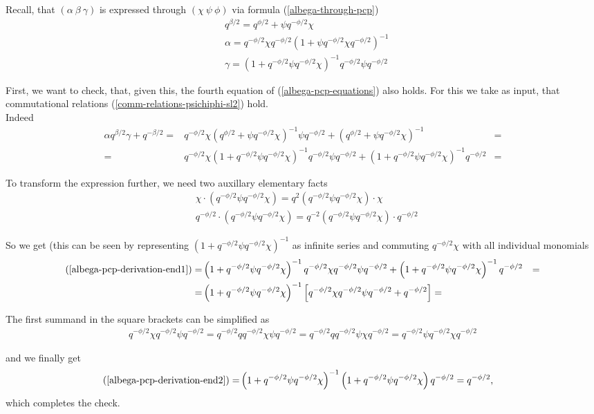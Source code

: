 \documentclass{article}
\newcommand{\lb}{\left (}
\newcommand{\rb}{\right )}
\newcommand{\lsb}{\left [}
\newcommand{\rsb}{\right ]}
\newcommand{\be}{\begin{eqnarray}}
\newcommand{\ee}{\end{eqnarray}}
\newcommand {\?}{\textit{???}}
\newcommand{\delabel}[1]{(\ref{#1})}
\begin{document}
Recall, that $(\alpha\ \beta\ \gamma)$ is expressed through $(\chi\ \psi\ \phi)$ via formula \delabel{albega-through-pcp}
\be
& q^{\beta/2} = q^{\phi/2} + \psi q^{-\phi/2} \chi \nonumber \\
& \alpha = q^{-\phi/2} \chi q^{-\phi/2} \lb 1 + \psi q^{-\phi/2} \chi q^{-\phi/2} \rb^{-1} \nonumber \\
& \gamma = \lb 1 + q^{-\phi/2} \psi q^{-\phi/2} \chi \rb^{-1} q^{-\phi/2} \psi q^{-\phi/2} \nonumber 
\ee

First, we want to check, that, given this, the fourth equation of \delabel{albega-pcp-equations} also holds.
For this we take as input, that commutational relations \delabel{comm-relations-psichiphi-sl2} hold.
\\
Indeed
\def\qbHalf{\lb q^{\phi/2} + \psi q^{-\phi/2} \chi \rb}
\def\qbMinusHalf{\qbHalf^{-1}}
\def\qbHalfNorm{\lb 1 + q^{-\phi/2} \psi q^{-\phi/2} \chi \rb}
\def\qbMinusHalfNorm{\qbHalfNorm^{-1}}
\be
\alpha q^{\beta/2} \gamma + q^{-\beta/2}
= & q^{-\phi/2}\chi \qbMinusHalf \psi q^{-\phi/2}
+ \qbMinusHalf & = \nonumber \\
\label{albega-pcp-derivation-end1}
= & q^{-\phi/2} \chi \qbMinusHalfNorm q^{-\phi/2} \psi q^{-\phi/2} + \qbMinusHalfNorm q^{-\phi/2} & =
\ee

To transform the expression further, we need two auxillary elementary facts
\be
& \chi \cdot \lb q^{-\phi/2} \psi q^{-\phi/2} \chi \rb
= q^{2} \lb q^{-\phi/2}\psi q^{-\phi/2} \chi \rb \cdot \chi \nonumber \\
& q^{-\phi/2} \cdot \lb q^{-\phi/2} \psi q^{-\phi/2} \chi \rb
= q^{-2} \lb q^{-\phi/2}\psi q^{-\phi/2} \chi \rb \cdot q^{-\phi/2} \nonumber
\ee

So we get (this can be seen by representing $\qbMinusHalfNorm$ as infinite series and commuting $q^{-\phi/2}\chi$
with all individual monomials
\be
\delabel{albega-pcp-derivation-end1} = & \qbMinusHalfNorm q^{-\phi/2} \chi q^{-\phi/2} \psi q^{-\phi/2}
+ \qbMinusHalfNorm q^{-\phi/2} & = \nonumber \\
= & \qbMinusHalfNorm \lsb q^{-\phi/2} \chi q^{-\phi/2} \psi q^{-\phi/2} + q^{-\phi/2}\rsb = \label{albega-pcp-derivation-end2}
\ee

The first summand in the square brackets can be simplified as
\be
q^{-\phi/2} \chi q^{-\phi/2} \psi q^{-\phi/2} = q^{-\phi/2} q q^{-\phi/2} \chi \psi q^{-\phi/2}
= q^{-\phi/2} q q^{-\phi/2} \psi \chi q^{-\phi/2} = q^{-\phi/2} \psi q^{-\phi/2} \chi q^{-\phi/2} \nonumber
\ee

and we finally get
\be
\delabel{albega-pcp-derivation-end2} = & \qbMinusHalfNorm \qbHalfNorm q^{-\phi/2} = q^{-\phi/2},
\ee
which completes the check.
\end{document}
